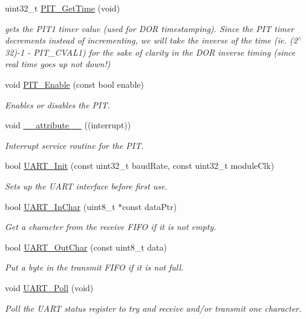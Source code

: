 \begin{DoxyCompactItemize}
uint32\+\_\+t \hyperlink{group__main__module_ga9ed891dffd7e79883573987184631b61}{P\+I\+T\+\_\+\+Get\+Time} (void)
\begin{DoxyCompactList}\small\item\em gets the P\+I\+T1 timer value (used for D\+O\+R timestamping). Since the P\+I\+T timer decrements instead of incrementing, we will take the inverse of the time (ie. (2$^\wedge$32)-\/1 -\/ P\+I\+T\+\_\+\+C\+V\+A\+L1) for the sake of clarity in the D\+O\+R inverse timing (since real time goes up not down!) \end{DoxyCompactList}\item 
void \hyperlink{group__main__module_gaed902f6158d6681e4b05d078575e4b09}{P\+I\+T\+\_\+\+Enable} (const bool enable)
\begin{DoxyCompactList}\small\item\em Enables or disables the P\+I\+T. \end{DoxyCompactList}\item 
void \hyperlink{group__main__module_ga445500277ba0e363873b34cffc015745}{\+\_\+\+\_\+attribute\+\_\+\+\_\+} ((interrupt))
\begin{DoxyCompactList}\small\item\em Interrupt service routine for the P\+I\+T. \end{DoxyCompactList}\item 
bool \hyperlink{group__main__module_gae5760d1a086ec79a33901db253000af9}{U\+A\+R\+T\+\_\+\+Init} (const uint32\+\_\+t baud\+Rate, const uint32\+\_\+t module\+Clk)
\begin{DoxyCompactList}\small\item\em Sets up the U\+A\+R\+T interface before first use. \end{DoxyCompactList}\item 
bool \hyperlink{group__main__module_ga03049bcc3bf9af2a75ee77016d3b0d60}{U\+A\+R\+T\+\_\+\+In\+Char} (uint8\+\_\+t $\ast$const data\+Ptr)
\begin{DoxyCompactList}\small\item\em Get a character from the receive F\+I\+F\+O if it is not empty. \end{DoxyCompactList}\item 
bool \hyperlink{group__main__module_gab20ebaeefd1f29d31e098ade31189dda}{U\+A\+R\+T\+\_\+\+Out\+Char} (const uint8\+\_\+t data)
\begin{DoxyCompactList}\small\item\em Put a byte in the transmit F\+I\+F\+O if it is not full. \end{DoxyCompactList}\item 
void \hyperlink{group__main__module_ga799b375101827a18f652a3f28ecefcd0}{U\+A\+R\+T\+\_\+\+Poll} (void)
\begin{DoxyCompactList}\small\item\em Poll the U\+A\+R\+T status register to try and receive and/or transmit one character. \end{DoxyCompactList}\end{DoxyCompactItemize}
